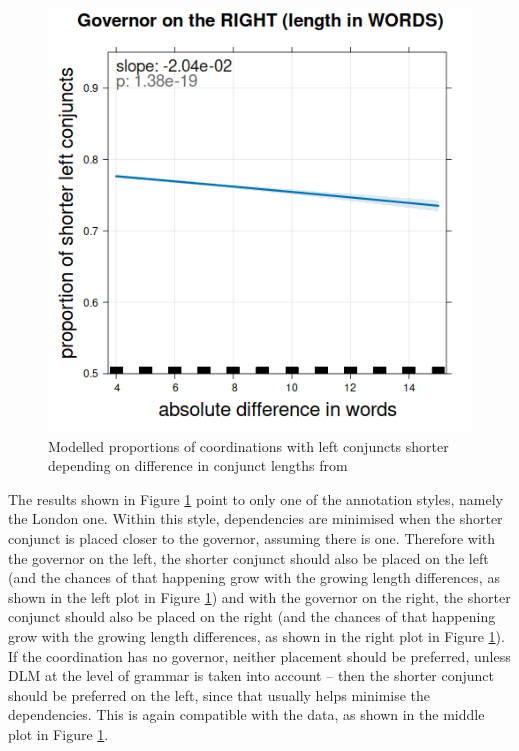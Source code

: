 \begin{figure}[H]
    \includegraphics[scale=0.27]{inputs/coca-R.png}
    \caption{Modelled proportions of coordinations with left conjuncts shorter depending on difference in conjunct lengths from \cite{prz:etal:24}}\label{fig:pbg24-results}
\end{figure}

The results shown in Figure \ref{fig:pbg24-results} point to only one of the annotation styles, namely the London one. Within this style, dependencies are minimised when the shorter conjunct is placed closer to the governor, assuming there is one. Therefore with the governor on the left, the shorter conjunct should also be placed on the left (and the chances of that happening grow with the growing length differences, as shown in the left plot in Figure \ref{fig:pbg24-results}) and with the governor on the right, the shorter conjunct should also be placed on the right (and the chances of that happening grow with the growing length differences, as shown in the right plot in Figure \ref{fig:pbg24-results}). If the coordination has no governor, neither placement should be preferred, unless DLM at the level of grammar is taken into account -- then the shorter conjunct should be preferred on the left, since that usually helps minimise the dependencies. This is again compatible with the data, as shown in the middle plot in Figure \ref{fig:pbg24-results}.

